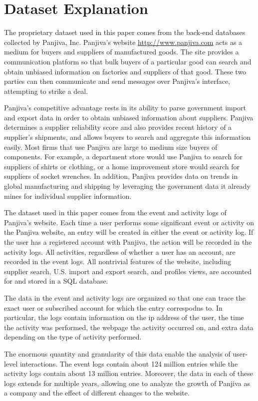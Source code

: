 \documentclass[12pt]{article}
\begin{document}
\section{Dataset Explanation}

The proprietary dataset used in this paper comes from the back-end databases collected by Panjiva, Inc. Panjiva's website \url{http://www.panjiva.com} acts as a medium for buyers and suppliers of manufactured goods. The site provides a communication platform so that bulk buyers of a particular good can search and obtain unbiased information on factories and suppliers of that good. These two parties can then communicate and send messages over Panjiva's interface, attempting to strike a deal. 

Panjiva's competitive advantage rests in its ability to parse government import and export data in order to obtain unbiased information about suppliers. Panjiva determines a supplier reliability score and also provides recent history of a supplier's shipments, and allows buyers to search and aggregate this information easily. Most firms that use Panjiva are large to medium size buyers of components. For example, a department store would use Panjiva to search for suppliers of shirts or clothing, or a home improvement store would search for suppliers of socket wrenches. In addition, Panjiva provides data on trends in global manufacturing and shipping by leveraging the government data it already mines for individual supplier information.

The dataset used in this paper comes from the event and activity logs of Panjiva's website. Each time a user performs some significant event or activity on the Panjiva website, an entry will be created in either the event or activity log. If the user has a registered account with Panjiva, the action will be recorded in the activity logs. All activities, regardless of whether a user has an account, are recorded in the event logs. All nontrivial features of the website, including supplier search, U.S. import and export search, and profiles views, are accounted for and stored in a SQL database.

The data in the event and activity logs are organized so that one can trace the exact user or subscribed account for which the entry correspodns to. In particular, the logs contain information on the ip address of the user, the time the activity was performed, the webpage the activity occurred on, and extra data depending on the type of activity performed. 

The enormous quantity and granularity of this data enable the analysis of user-level interactions. The event logs contain about 124 million entries while the activity logs contain about 13 million entries. Moreover, the data in each of these logs extends for multiple years, allowing one to analyze the growth of Panjiva as a company and the effect of different changes to the website.
\end{document}
